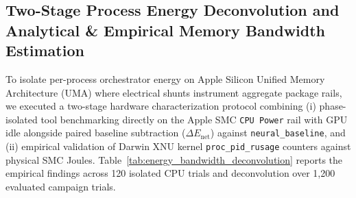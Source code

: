 \documentclass[preprint,12pt,3p]{elsarticle}
\begin{document}
\subsection{Two-Stage Process Energy Deconvolution and Analytical \& Empirical Memory Bandwidth Estimation}
\label{sec:energy_bandwidth_deconvolution}
To isolate per-process orchestrator energy on Apple Silicon Unified Memory Architecture (UMA) where electrical shunts instrument aggregate package rails, we executed a two-stage hardware characterization protocol combining (i) phase-isolated tool benchmarking directly on the Apple SMC \texttt{CPU Power} rail with GPU idle alongside paired baseline subtraction ($\Delta E_{\text{net}}$) against \texttt{neural\_baseline}, and (ii) empirical validation of Darwin XNU kernel \texttt{proc\_pid\_rusage} counters against physical SMC Joules. Table~\ref{tab:energy_bandwidth_deconvolution} reports the empirical findings across 120 isolated CPU trials and deconvolution over 1,200 evaluated campaign trials.


\end{document}
